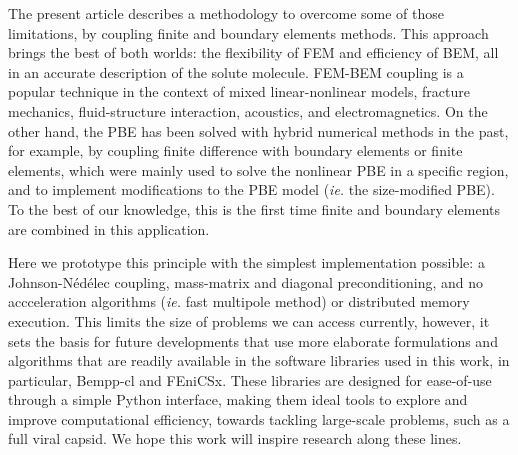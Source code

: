 The present article describes a methodology to overcome some of those limitations, by coupling finite and boundary elements methods.
This approach brings the best of both worlds: the flexibility of FEM and efficiency of BEM, all in an accurate description of the solute molecule.
FEM-BEM coupling is a popular technique in the context of mixed linear-nonlinear models,\cite{carstensen1995coupling,aurada2013classical} fracture mechanics,\cite{aour2007coupled} fluid-structure interaction,\cite{estorff1991fem} acoustics,\cite{hiptmair2006stabilized} and electromagnetics.\cite{matsuoka1988calculation,hiptmair2008stabilized,bruckner20123d}
On the other hand, the PBE has been solved with hybrid numerical methods in the past, for example, by coupling finite difference with boundary elements\cite{boschitsch2004hybrid} or finite elements,\cite{xie2016new,ying2018hybrid} which were mainly used to solve the nonlinear PBE in a specific region, and to implement modifications to the PBE model ({\it ie.} the size-modified PBE).
To the best of our knowledge, this is the first time finite and boundary elements are combined in this application.

Here we prototype this principle with the simplest implementation possible: a Johnson-N\'ed\'elec\cite{johnson1980coupling} coupling, mass-matrix and diagonal preconditioning, and no accceleration algorithms ({\it ie.} fast multipole method) or distributed memory execution. 
This limits the size of problems we can access currently, however, it sets the basis for future developments that use more elaborate formulations and algorithms that are readily available in the software libraries used in this work, in particular, Bempp-cl and FEniCSx.
These libraries are designed for ease-of-use through a simple Python interface, making them ideal tools to explore and improve computational efficiency, towards tackling large-scale problems, such as a full viral capsid.\cite{MartinezETal2019,wang2021high}
We hope this work will inspire research along these lines.
